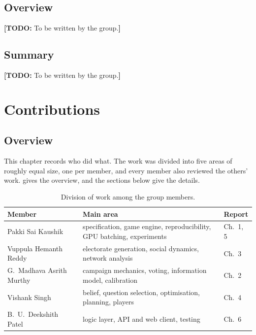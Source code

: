 \documentclass[11pt,a4paper,oneside]{report}
\newcommand{\todo}[1]{\textcolor{todo}{\textbf{[TODO:} #1\textbf{]}}}
\newcommand{\overviewsection}{\section{Overview}}
\newcommand{\summarysection}{\section{Summary}}
\begin{document}
\overviewsection

\todo{To be written by the group.}


\summarysection

\todo{To be written by the group.}

\chapter{Contributions}\label{ch:contrib}

\overviewsection

This chapter records who did what. The work was divided into five areas of roughly equal size, one per
member, and every member also reviewed the others' work.  gives the overview, and the
sections below give the details.

\begin{table}[h]
\centering
\caption{Division of work among the group members.}
\label{tab:contrib}
\small
\begin{tabularx}{\linewidth}{@{}l>{\raggedright\arraybackslash}X l@{}}
\toprule
Member & Main area & Report \\
\midrule
Pakki Sai Kaushik          & specification, game engine, reproducibility, GPU batching, experiments
                           & Ch.~1, 5 \\
Vuppula Hemanth Reddy      & electorate generation, social dynamics, network analysis      & Ch.~3 \\
G.~Madhava Asrith Murthy   & campaign mechanics, voting, information model, calibration    & Ch.~2 \\
Vishank Singh              & belief, question selection, optimisation, planning, players   & Ch.~4 \\
B.~U.~Deekshith Patel      & logic layer, API and web client, testing                       & Ch.~6 \\
\bottomrule
\end{tabularx}
\end{table}
\end{document}

